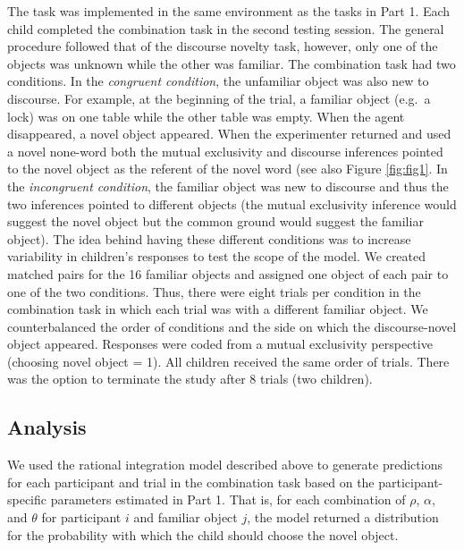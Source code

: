 \documentclass[
  man,mask,floatsintext]{apa6}
\begin{document}
The task was implemented in the same environment as the tasks in Part 1. Each child completed the combination task in the second testing session. The general procedure followed that of the discourse novelty task, however, only one of the objects was unknown while the other was familiar. The combination task had two conditions. In the \emph{congruent condition}, the unfamiliar object was also new to discourse. For example, at the beginning of the trial, a familiar object (e.g.~a lock) was on one table while the other table was empty. When the agent disappeared, a novel object appeared. When the experimenter returned and used a novel none-word both the mutual exclusivity and discourse inferences pointed to the novel object as the referent of the novel word (see also Figure \ref{fig:fig1}. In the \emph{incongruent condition}, the familiar object was new to discourse and thus the two inferences pointed to different objects (the mutual exclusivity inference would suggest the novel object but the common ground would suggest the familiar object). The idea behind having these different conditions was to increase variability in children's responses to test the scope of the model. We created matched pairs for the 16 familiar objects and assigned one object of each pair to one of the two conditions. Thus, there were eight trials per condition in the combination task in which each trial was with a different familiar object. We counterbalanced the order of conditions and the side on which the discourse-novel object appeared. Responses were coded from a mutual exclusivity perspective (choosing novel object = 1). All children received the same order of trials. There was the option to terminate the study after 8 trials (two children).

\hypertarget{analysis-1}{%
\subsection{Analysis}\label{analysis-1}}

We used the rational integration model described above to generate predictions for each participant and trial in the combination task based on the participant-specific parameters estimated in Part 1. That is, for each combination of \(\rho\), \(\alpha\), and \(\theta\) for participant \(i\) and familiar object \(j\), the model returned a distribution for the probability with which the child should choose the novel object.
\end{document}

